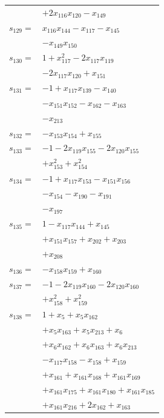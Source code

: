\begin{longtable}{@{}r@{\;}l@{}}
 & \(\displaystyle +2x_{116}x_{120} -x_{149}\) \\[3pt]
\(s_{129}=\) & \(\displaystyle x_{116}x_{144} -x_{117} -x_{145}\) \\
 & \(\displaystyle -x_{149}x_{150}\) \\[3pt]
\(s_{130}=\) & \(\displaystyle 1 +x_{117}^{2} -2x_{117}x_{119}\) \\
 & \(\displaystyle -2x_{117}x_{120} +x_{151}\) \\[3pt]
\(s_{131}=\) & \(\displaystyle -1 +x_{117}x_{139} -x_{140}\) \\
 & \(\displaystyle -x_{151}x_{152} -x_{162} -x_{163}\) \\
 & \(\displaystyle -x_{213}\) \\[3pt]
\(s_{132}=\) & \(\displaystyle -x_{153}x_{154} +x_{155}\) \\[3pt]
\(s_{133}=\) & \(\displaystyle -1 -2x_{119}x_{155} -2x_{120}x_{155}\) \\
 & \(\displaystyle +x_{153}^{2} +x_{154}^{2}\) \\[3pt]
\(s_{134}=\) & \(\displaystyle -1 +x_{117}x_{153} -x_{151}x_{156}\) \\
 & \(\displaystyle -x_{154} -x_{190} -x_{191}\) \\
 & \(\displaystyle -x_{197}\) \\[3pt]
\(s_{135}=\) & \(\displaystyle 1 -x_{117}x_{144} +x_{145}\) \\
 & \(\displaystyle +x_{151}x_{157} +x_{202} +x_{203}\) \\
 & \(\displaystyle +x_{208}\) \\[3pt]
\(s_{136}=\) & \(\displaystyle -x_{158}x_{159} +x_{160}\) \\[3pt]
\(s_{137}=\) & \(\displaystyle -1 -2x_{119}x_{160} -2x_{120}x_{160}\) \\
 & \(\displaystyle +x_{158}^{2} +x_{159}^{2}\) \\[3pt]
\(s_{138}=\) & \(\displaystyle 1 +x_{5} +x_{5}x_{162}\) \\
 & \(\displaystyle +x_{5}x_{163} +x_{5}x_{213} +x_{6}\) \\
 & \(\displaystyle +x_{6}x_{162} +x_{6}x_{163} +x_{6}x_{213}\) \\
 & \(\displaystyle -x_{117}x_{158} -x_{158} +x_{159}\) \\
 & \(\displaystyle +x_{161} +x_{161}x_{168} +x_{161}x_{169}\) \\
 & \(\displaystyle +x_{161}x_{175} +x_{161}x_{180} +x_{161}x_{185}\) \\
 & \(\displaystyle +x_{161}x_{216} +2x_{162} +x_{163}\) \\

\end{longtable}
